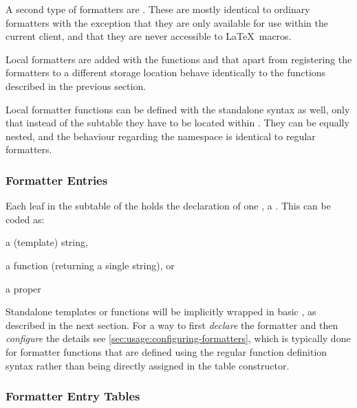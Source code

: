 \documentclass[12pt]{scrartcl}
\begin{document}
A second type of formatters are .  These
are mostly identical to ordinary formatters with the exception that they are
only available for use within the current client, and that they are never
accessible to \LaTeX\ macros.

Local formatters are added with the functions
 and 
that apart from registering the formatters to a different storage location
behave identically to the functions described in the previous section.

Local formatter functions can be defined with the standalone syntax as well,
only that instead of the  subtable they have to be located
within .  They can be equally nested, and the behaviour regarding
the namespace is identical to regular formatters.


\subsubsection{Formatter Entries}
\label{sec:usage:formatter-entries}

Each leaf in the  subtable of the 
holds the declaration of one , a .  This
can be coded as:

\begin{itemize*}
\item a (template) string,
\item a function (returning a single string), or
\item a proper 
\end{itemize*}

Standalone templates or functions will be implicitly wrapped in basic
, as described in the next
section. For a way to first \emph{declare} the formatter and then
\emph{configure} the details see \vref{sec:usage:configuring-formatters}, which
is typically done for formatter functions that are defined using the regular
function definition syntax rather than being directly assigned in the table
constructor.


\subsubsection{Formatter Entry Tables}
\label{sec:usage-formatter-entry-tables}
\end{document}
